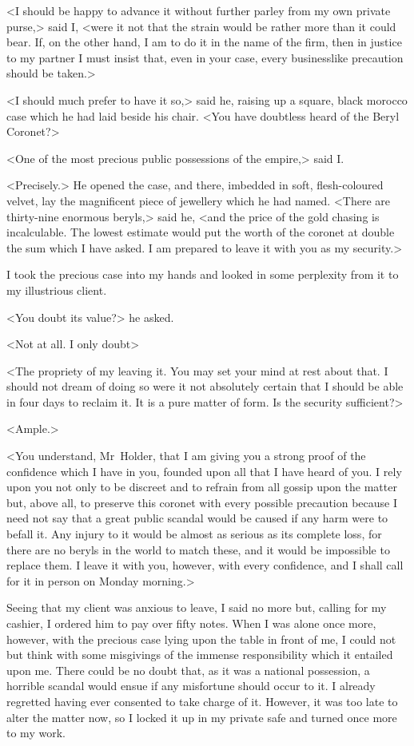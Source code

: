 <I should be happy to advance it without further parley from my own private purse,> said I, <were it not that the strain would be rather more than it could bear. If, on the other hand, I am to do it in the name of the firm, then in justice to my partner I must insist that, even in your case, every businesslike precaution should be taken.>

<I should much prefer to have it so,> said he, raising up a square, black morocco case which he had laid beside his chair. <You have doubtless heard of the Beryl Coronet?>

<One of the most precious public possessions of the empire,> said I\@.

<Precisely.> He opened the case, and there, imbedded in soft, flesh-coloured velvet, lay the magnificent piece of jewellery which he had named. <There are thirty-nine enormous beryls,> said he, <and the price of the gold chasing is incalculable. The lowest estimate would put the worth of the coronet at double the sum which I have asked. I am prepared to leave it with you as my security.>

I took the precious case into my hands and looked in some perplexity from it to my illustrious client.

<You doubt its value?> he asked.

<Not at all. I only doubt\longdash>

<The propriety of my leaving it. You may set your mind at rest about that. I should not dream of doing so were it not absolutely certain that I should be able in four days to reclaim it. It is a pure matter of form. Is the security sufficient?>

<Ample.>

<You understand, Mr~Holder, that I am giving you a strong proof of the confidence which I have in you, founded upon all that I have heard of you. I rely upon you not only to be discreet and to refrain from all gossip upon the matter but, above all, to preserve this coronet with every possible precaution because I need not say that a great public scandal would be caused if any harm were to befall it. Any injury to it would be almost as serious as its complete loss, for there are no beryls in the world to match these, and it would be impossible to replace them. I leave it with you, however, with every confidence, and I shall call for it in person on Monday morning.>

Seeing that my client was anxious to leave, I said no more but, calling for my cashier, I ordered him to pay over fifty  notes. When I was alone once more, however, with the precious case lying upon the table in front of me, I could not but think with some misgivings of the immense responsibility which it entailed upon me. There could be no doubt that, as it was a national possession, a horrible scandal would ensue if any misfortune should occur to it. I already regretted having ever consented to take charge of it. However, it was too late to alter the matter now, so I locked it up in my private safe and turned once more to my work.

